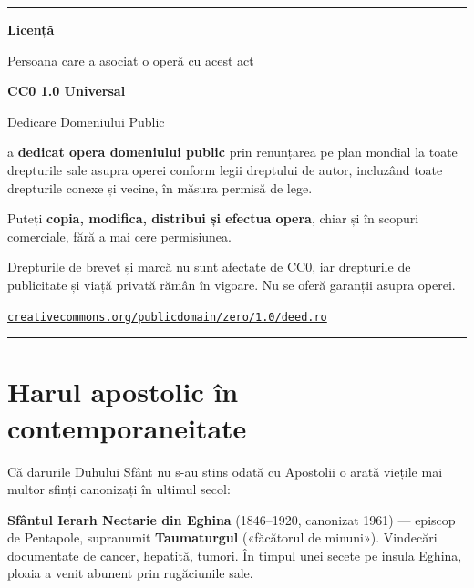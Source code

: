 \documentclass[12pt,a4paper,twoside,openany]{book}
\begin{document}
\vspace*{\fill}

\begin{center}
\begin{minipage}{0.8\textwidth}
\centering
\rule{\textwidth}{0.4pt}

\vspace{1em}
{\Large\sffamily\bfseries\color{primarydark} Licență}
\vspace{0.8em}

Persoana care a asociat o operă cu acest act

\vspace{0.5em}
{\LARGE\sffamily\bfseries CC0 1.0 Universal}
\vspace{0.3em}

{\large\sffamily Dedicare Domeniului Public}
\vspace{0.6em}

a \textbf{dedicat opera domeniului public} prin renunțarea pe plan mondial la toate drepturile sale asupra operei conform legii dreptului de autor, incluzând toate drepturile conexe și vecine, în măsura permisă de lege.

\vspace{0.4em}
Puteți \textbf{copia, modifica, distribui și efectua opera}, chiar și în scopuri comerciale, fără a mai cere permisiunea.

\vspace{0.4em}
{\small\color{gray}
Drepturile de brevet și marcă nu sunt afectate de CC0, iar drepturile de publicitate și viață privată rămân în vigoare. Nu se oferă garanții asupra operei.
}

\vspace{0.8em}
\href{https://creativecommons.org/publicdomain/zero/1.0/deed.ro}{\texttt{creativecommons.org/publicdomain/zero/1.0/deed.ro}}

\vspace{1em}
\rule{\textwidth}{0.4pt}
\end{minipage}
\end{center}
\newpage

\tableofcontents
\newpage


\chapter{Harul apostolic în contemporaneitate}\label{harisme}
Că darurile Duhului Sfânt nu s-au stins odată cu Apostolii o arată viețile mai multor sfinți canonizați în ultimul secol:

\textbf{Sfântul Ierarh Nectarie din Eghina} (1846–1920, canonizat 1961) — episcop de Pentapole, supranumit \textbf{Taumaturgul} («făcătorul de minuni»). Vindecări documentate de cancer, hepatită, tumori. În timpul unei secete pe insula Eghina, ploaia a venit abun­ent prin rugăciunile sale.
\end{document}
